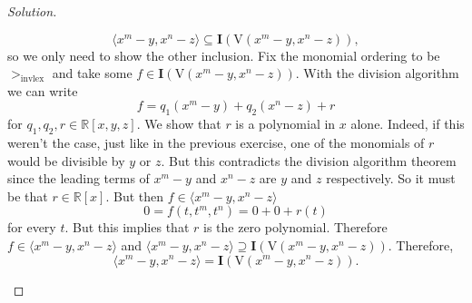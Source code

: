 \documentclass[]{article}
\newcommand\<{\langle}
\renewcommand\>{\rangle}
\newcommand{\RR}{\ensuremath{\mathbb{R}}}
\newenvironment{solution}
{
	\begin{proof}[Solution] \text{ }
		\\
	}
	{
	\end{proof}
}
\begin{document}
\begin{solution}
\begin{enumerate}
		$$
			\<x^m - y, x^n - z\> \subseteq \textbf{I}\left(\text{V}\left(x^m - y, x^n - z\right)\right),
		$$
		so we only need to show the other inclusion. Fix the monomial ordering to be $>_\text{invlex}$ and take some $f \in \textbf{I}\left(\text{V}\left(x^m - y, x^n - z\right)\right)$. With the division algorithm we can write
		$$
			f = q_1\left(x^m - y\right) + q_2\left(x^n - z\right) + r
		$$
		for $q_1, q_2, r \in \RR[x,y,z]$. We show that $r$ is a polynomial in $x$ alone. Indeed, if this weren't the case, just like in the previous exercise, one of the monomials of $r$ would be divisible by $y$ or $z$. But this contradicts the division algorithm theorem since the leading terms of $x^m - y$ and $x^n - z$ are $y$ and $z$ respectively. So it must be that $r \in \RR[x]$. But then $f \in \<x^m - y, x^n - z\>$
		$$
			0 = f(t, t^m, t^n) = 0 + 0 + r(t)
		$$
		for every $t$. But this implies that $r$ is the zero polynomial. Therefore $f \in \<x^m - y, x^n - z\>$ and $\<x^m - y, x^n - z\> \supseteq \textbf{I}\left(\text{V}\left(x^m - y, x^n - z\right)\right)$. Therefore,
		$$
			\<x^m - y, x^n - z\> = \textbf{I}\left(\text{V}\left(x^m - y, x^n - z\right)\right).
		$$
	\end{enumerate}
\end{solution}
\end{document}
